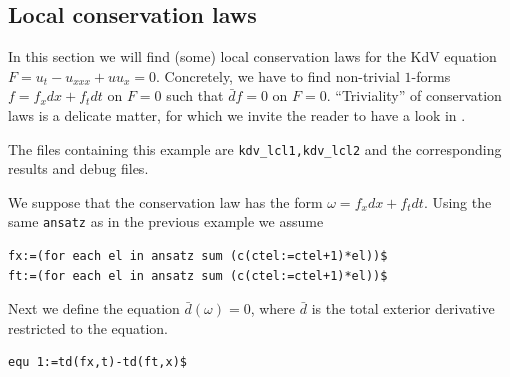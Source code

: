 \subsection{Local conservation laws}
\label{cdesec:local-cons-laws}

In this section we will find (some) local conservation laws for the KdV
equation $F=u_t-u_{xxx}+uu_x=0$. Concretely, we have to find non-trivial
$1$-forms $f=f_xdx+f_tdt$ on $F=0$ such that $\bar d f=0$ on
$F=0$. ``Triviality'' of conservation laws is a delicate matter, for which we
invite the reader to have a look in \cite{Krasilshchik:99}.

The files containing this example are \texttt{kdv\_lcl1,kdv\_lcl2}
and the corresponding results and debug files.

We suppose that the conservation law has the form $\omega=f_x dx+f_t dt$.
Using the same \texttt{ansatz} as in the previous example we assume
\begin{verbatim}
fx:=(for each el in ansatz sum (c(ctel:=ctel+1)*el))$
ft:=(for each el in ansatz sum (c(ctel:=ctel+1)*el))$
\end{verbatim}
Next we define the equation $\bar d(\omega)=0$, where $\bar d$ is the total
exterior derivative restricted to the equation.
\begin{verbatim}
equ 1:=td(fx,t)-td(ft,x)$
\end{verbatim}

